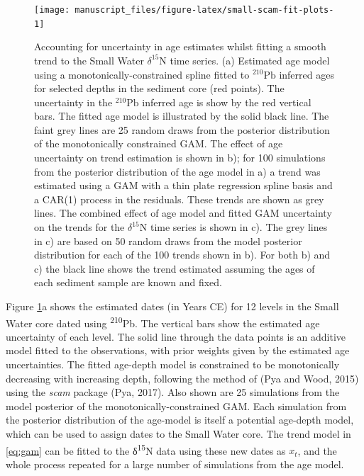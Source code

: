 \documentclass[12pt,]{article}
\begin{document}
\begin{figure}

{\centering \texttt{[image: manuscript\_files/figure-latex/small-scam-fit-plots-1]} 

}

\caption{Accounting for uncertainty in age estimates whilst fitting a smooth trend to the Small Water $\delta^{15}\text{N}$ time series. (a) Estimated age model using a monotonically-constrained spline fitted to ${}^{210}\text{Pb}$ inferred ages for selected depths in the sediment core (red points). The uncertainty in the ${}^{210}\text{Pb}$ inferred age is show by the red vertical bars. The fitted age model is illustrated by the solid black line. The faint grey lines are 25 random draws from the posterior distribution of the monotonically constrained GAM. The effect of age uncertainty on trend estimation is shown in b); for 100 simulations from the posterior distribution of the age model in a) a trend was estimated using a GAM with a thin plate regression spline basis and a CAR(1) process in the residuals. These trends are shown as grey lines. The combined effect of age model and fitted GAM uncertainty on the trends for the $\delta^{15}\text{N}$ time series is shown in c). The grey lines in c) are based on 50 random draws from the model posterior distribution for each of the 100 trends shown in b). For both b) and c) the black line shows the trend estimated assuming the ages of each sediment sample are known and fixed.}\label{fig:small-scam-fit-plots}
\end{figure}

Figure \ref{fig:small-scam-fit-plots}a shows the estimated dates (in
Years CE) for 12 levels in the Small Water core dated using
\textsuperscript{210}Pb. The vertical bars show the estimated age
uncertainty of each level. The solid line through the data points is an
additive model fitted to the observations, with prior weights given by
the estimated age uncertainties. The fitted age-depth model is
constrained to be monotonically decreasing with increasing depth,
following the method of (Pya and Wood, 2015) using the \emph{scam}
package (Pya, 2017). Also shown are 25 simulations from the model
posterior of the monotonically-constrained GAM. Each simulation from the
posterior distribution of the age-model is itself a potential age-depth
model, which can be used to assign dates to the Small Water core. The
trend model in \eqref{eq:gam} can be fitted to the
δ\textsuperscript{15}N data using these new dates as \(x_t\), and the
whole process repeated for a large number of simulations from the age
model.
\end{document}
